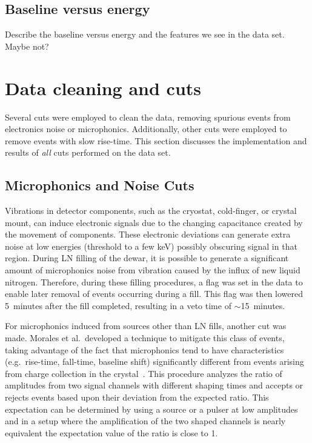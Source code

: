 		\subsection{Baseline versus energy}
		\label{sec:BeGeBaseline}

Describe the baseline versus energy and the features we see in the data set.  Maybe not?


	\section{Data cleaning and cuts}
	\label{sec:BeGeCuts}	
	
	Several cuts were employed to clean the data, removing spurious events from electronics noise or microphonics.  Additionally, other cuts were employed to remove events with slow rise-time.  This section discusses the implementation and results of \emph{all} cuts performed on the data set.  
	
		\subsection{Microphonics and Noise Cuts}
	     	\label{sec:MicroCuts}	
	
	Vibrations in detector components, such as the cryostat, cold-finger, or crystal mount, can induce electronic signals due to the changing capacitance created by the movement of components.  These electronic deviations can generate extra noise at low energies (threshold to a few keV) possibly obscuring signal in that region.  During LN filling of the dewar, it is possible to generate a significant amount of microphonics noise from vibration caused by the influx of new liquid nitrogen.  Therefore, during these filling procedures, a flag was set in the data to enable later removal of events occurring during a fill.  This flag was then lowered 5~minutes after the fill completed, resulting in a veto time of $\sim$15~minutes.  
		
	For microphonics induced from sources other than LN fills, another cut was made.  Morales et al.~developed a technique to mitigate this class of events, taking advantage of the fact that microphonics tend to have characteristics (e.g.~rise-time, fall-time, baseline shift) significantly different from events arising from charge collection in the crystal~\cite{Morales1992410}.  This procedure analyzes the ratio of amplitudes from two signal channels with different shaping times  and accepts or rejects events based upon their deviation from the expected ratio.  This expectation can be determined by using a source or a pulser at low amplitudes and in a setup where the amplification of the two shaped channels is nearly equivalent the expectation value of the ratio is close to 1.  
	
